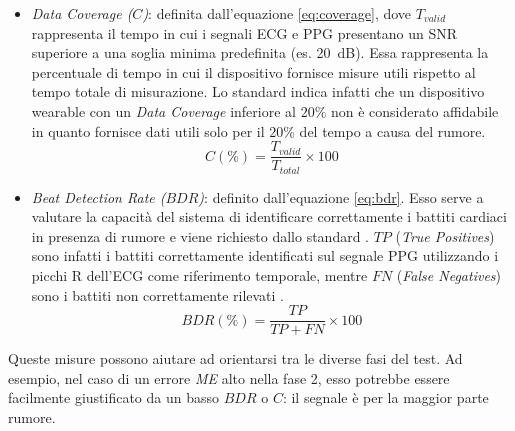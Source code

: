 \documentclass[11pt,a4paper]{article}
\begin{document}
\begin{itemize}
    \item \textit{Data Coverage ($C$)}: definita dall'equazione \eqref{eq:coverage}, dove $T_{valid}$ rappresenta il tempo in cui i segnali ECG e PPG presentano un SNR superiore a una soglia minima predefinita (es. \qty{20}{dB}). Essa rappresenta la percentuale di tempo in cui il dispositivo fornisce misure utili rispetto al tempo totale di misurazione. Lo standard \cite{ieee1708} indica infatti che un dispositivo wearable con un \textit{Data Coverage} inferiore al $20\%$ non è considerato affidabile in quanto fornisce dati utili solo per il $20\%$ del tempo a causa del rumore.
    \begin{equation}
        C (\%) = \frac{T_{valid}}{T_{total}} \times 100
        \label{eq:coverage}
    \end{equation}
    \item \textit{Beat Detection Rate ($BDR$)}: definito dall'equazione \eqref{eq:bdr}. Esso serve a valutare la capacità del sistema di identificare correttamente i battiti cardiaci in presenza di rumore e viene richiesto dallo standard \cite{ieee1708}. $TP$ (\textit{True Positives}) sono infatti i battiti correttamente identificati sul segnale PPG utilizzando i picchi R dell'ECG come riferimento temporale, mentre $FN$ (\textit{False Negatives}) sono i battiti non correttamente rilevati \cite{mukkamala2015}. 
    \begin{equation}
        BDR (\%) = \frac{TP}{TP + FN} \times 100
        \label{eq:bdr}
    \end{equation}
\end{itemize}
Queste misure possono aiutare ad orientarsi tra le diverse fasi del test. Ad esempio, nel caso di un errore \textit{ME} alto nella fase 2, esso potrebbe essere facilmente giustificato da un basso $BDR$ o $C$: il segnale è per la maggior parte rumore. 

\end{document}
